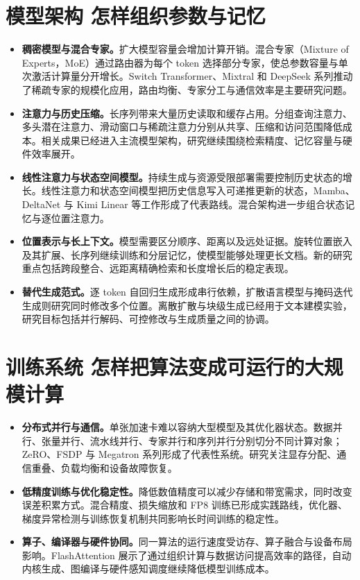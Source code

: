\section{模型架构 怎样组织参数与记忆}

\begin{itemize}
    \item \textbf{稠密模型与混合专家。}扩大模型容量会增加计算开销。混合专家（Mixture of Experts，MoE）通过路由器为每个 token 选择部分专家，使总参数容量与单次激活计算量分开增长。Switch Transformer、Mixtral 和 DeepSeek 系列推动了稀疏专家的规模化应用，路由均衡、专家分工与通信效率是主要研究问题。
    \item \textbf{注意力与历史压缩。}长序列带来大量历史读取和缓存占用。分组查询注意力、多头潜在注意力、滑动窗口与稀疏注意力分别从共享、压缩和访问范围降低成本。相关成果已经进入主流模型架构，研究继续围绕检索精度、记忆容量与硬件效率展开。
    \item \textbf{线性注意力与状态空间模型。}持续生成与资源受限部署需要控制历史状态的增长。线性注意力和状态空间模型把历史信息写入可递推更新的状态，Mamba、DeltaNet 与 Kimi Linear 等工作形成了代表路线。混合架构进一步组合状态记忆与逐位置注意力。
    \item \textbf{位置表示与长上下文。}模型需要区分顺序、距离以及远处证据。旋转位置嵌入及其扩展、长序列继续训练和分层记忆，使模型能够处理更长文档。新的研究重点包括跨段整合、远距离精确检索和长度增长后的稳定表现。
    \item \textbf{替代生成范式。}逐 token 自回归生成形成串行依赖，扩散语言模型与掩码迭代生成则研究同时修改多个位置。离散扩散与块级生成已经用于文本建模实验，研究目标包括并行解码、可控修改与生成质量之间的协调。
\end{itemize}

\section{训练系统 怎样把算法变成可运行的大规模计算}

\begin{itemize}
    \item \textbf{分布式并行与通信。}单张加速卡难以容纳大型模型及其优化器状态。数据并行、张量并行、流水线并行、专家并行和序列并行分别切分不同计算对象；ZeRO、FSDP 与 Megatron 系列形成了代表性系统。研究关注显存分配、通信重叠、负载均衡和设备故障恢复。
    \item \textbf{低精度训练与优化稳定性。}降低数值精度可以减少存储和带宽需求，同时改变误差积累方式。混合精度、损失缩放和 FP8 训练已形成实践路线，优化器、梯度异常检测与训练恢复机制共同影响长时间训练的稳定性。
    \item \textbf{算子、编译器与硬件协同。}同一算法的运行速度受访存、算子融合与设备布局影响。FlashAttention 展示了通过组织计算与数据访问提高效率的路径，自动内核生成、图编译与硬件感知调度继续降低模型训练成本。
\end{itemize}

